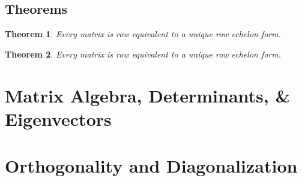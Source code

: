 \documentclass[5pt]{article}
\begin{document}
\begin{multicols}{2}
\subsection{Theorems}
\newtheorem{theorem}{Theorem}
\newtheorem{properties}{Properties}
\begin{theorem}
Every matrix is row equivalent to a unique row echelon form.
\end{theorem}

\begin{theorem}
Every matrix is row equivalent to a unique row echelon form.
\end{theorem}

\section{Matrix Algebra, Determinants, \& Eigenvectors}

\section{Orthogonality and Diagonalization}

\end{multicols}
\end{document}
